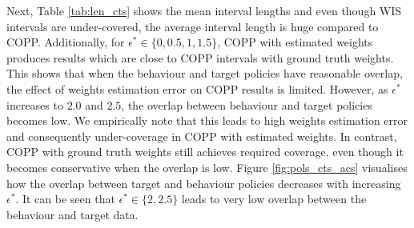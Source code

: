 Next, Table \ref{tab:len_cts} shows the mean interval lengths and even though WIS intervals are under-covered, the average interval length is huge compared to COPP. Additionally, for $\epsilon^* \in \{0, 0.5, 1, 1.5\}$, COPP with estimated weights produces results which are close to COPP intervals with ground truth weights. This shows that when the behaviour and target policies have reasonable overlap, the effect of weights estimation error on COPP results is limited. However, as $\epsilon^*$ increases to $2.0$ and $2.5$, the overlap between behaviour and target policies becomes low. We empirically note that this leads to high weights estimation error and consequently under-coverage in COPP with estimated weights. In contrast, COPP with ground truth weights still achieves required coverage, even though it becomes conservative when the overlap is low. Figure \ref{fig:pols_cts_acs} visualises how the overlap between target and behaviour policies decreases with increasing $\epsilon^*$. It can be seen that $\epsilon^* \in \{2, 2.5\}$ leads to very low overlap between the behaviour and target data.



\begin{table}[htp!]
\begin{center}
\caption{Mean Coverage as a function of policy shift with 2 standard errors over 10 runs.}
\label{tab:cov_cts}
\end{center}
\end{table}

